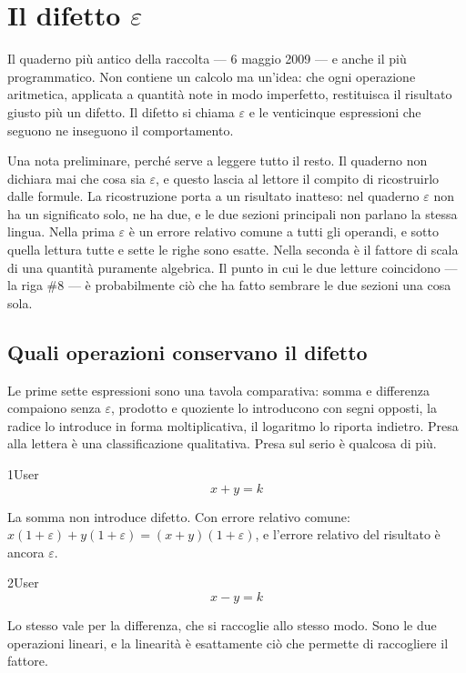 \chapter{Il difetto $\varepsilon$}
\label{cap:teoria}

Il quaderno più antico della raccolta — 6 maggio 2009 — e anche il più programmatico. Non contiene un calcolo ma un'idea: che ogni operazione aritmetica, applicata a quantità note in modo imperfetto, restituisca il risultato giusto più un difetto. Il difetto si chiama $\varepsilon$ e le venticinque espressioni che seguono ne inseguono il comportamento.

Una nota preliminare, perché serve a leggere tutto il resto. Il quaderno non dichiara mai che cosa sia $\varepsilon$, e questo lascia al lettore il compito di ricostruirlo dalle formule. La ricostruzione porta a un risultato inatteso: nel quaderno $\varepsilon$ non ha un significato solo, ne ha due, e le due sezioni principali non parlano la stessa lingua. Nella prima $\varepsilon$ è un errore relativo comune a tutti gli operandi, e sotto quella lettura tutte e sette le righe sono esatte. Nella seconda è il fattore di scala di una quantità puramente algebrica. Il punto in cui le due letture coincidono — la riga $\#8$ — è probabilmente ciò che ha fatto sembrare le due sezioni una cosa sola.

\section{Quali operazioni conservano il difetto}

Le prime sette espressioni sono una tavola comparativa: somma e differenza compaiono senza $\varepsilon$, prodotto e quoziente lo introducono con segni opposti, la radice lo introduce in forma moltiplicativa, il logaritmo lo riporta indietro. Presa alla lettera è una classificazione qualitativa. Presa sul serio è qualcosa di più.

\begin{espr}{1}{User}{}
\[
x + y = k
\]
\end{espr}
La somma non introduce difetto. Con errore relativo comune: $x(1+\varepsilon)+y(1+\varepsilon)=(x+y)(1+\varepsilon)$, e l'errore relativo del risultato è ancora $\varepsilon$.

\begin{espr}{2}{User}{}
\[
x - y = k
\]
\end{espr}
Lo stesso vale per la differenza, che si raccoglie allo stesso modo. Sono le due operazioni lineari, e la linearità è esattamente ciò che permette di raccogliere il fattore.

